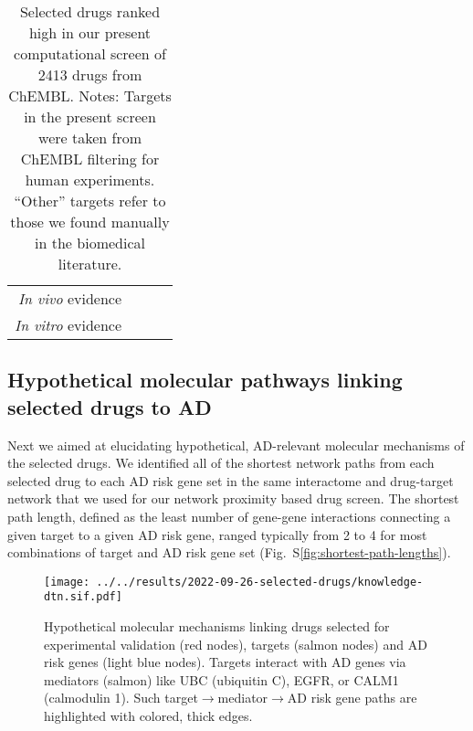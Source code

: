 \documentclass[letterpaper]{article}
\begin{document}
\begin{table}
\begin{tabular}{r|c|c|c}
               \emph{In vivo} evidence & \cite{DeMiranda2013,DeMiranda2014} &       \cite{Keene2002} &                \cite{Cicchetti2019} \\
               \emph{In vitro} evidence &      \cite{Lee2019,Rzemieniec2019} &                        &          \cite{Besouw2013,Paul2019} \\
\bottomrule
\end{tabular}
\caption{
Selected drugs ranked high in our present computational screen of 2413 drugs
from ChEMBL.  Notes: Targets in the present screen were taken from ChEMBL filtering for human
experiments. ``Other'' targets refer to those we found manually in the
biomedical literature.
}
\label{tab:selected-drugs}
\end{table}

\subsection{Hypothetical molecular pathways linking selected drugs to AD}

Next we aimed at elucidating hypothetical, AD-relevant molecular mechanisms of
the selected drugs.  We identified all of the shortest network paths from each selected
drug to each AD risk gene set in the same interactome and drug-target network that
we used for our network proximity based drug screen.  The shortest path
length, defined as the least number of gene-gene interactions connecting a
given target to a given AD risk gene, ranged typically from 2 to 4 for most
combinations of target and AD risk gene set
(Fig.~S\ref{fig:shortest-path-lengths}).

\begin{figure}
\texttt{[image: ../../results/2022-09-26-selected-drugs/knowledge-dtn.sif.pdf]}
\caption{Hypothetical molecular mechanisms linking drugs selected for
  experimental validation (red nodes), targets
  (salmon nodes) and AD risk genes (light blue nodes).  Targets interact with AD
  genes via mediators (salmon) like UBC (ubiquitin C), EGFR, or CALM1
  (calmodulin 1).  Such target$\rightarrow$mediator$\rightarrow$AD risk gene paths
  are highlighted with colored, thick edges.
}
\label{fig:drug-AD-genes-network}
\end{figure}
\end{document}
